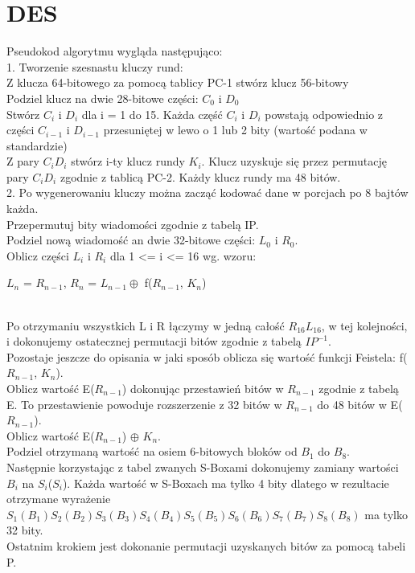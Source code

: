 \documentclass[oneside]{mgr}
\begin{document}
\chapter{DES}
Pseudokod algorytmu wygląda następująco:\vspace*{1 cm}\\
1. Tworzenie szesnastu kluczy rund:\\
Z klucza 64-bitowego za pomocą tablicy PC-1 stwórz klucz 56-bitowy\\
Podziel klucz na dwie 28-bitowe części: $C_0$ i $D_0$\\
Stwórz $C_i$ i $D_i$ dla i = 1 do 15. Każda część $C_i$ i $D_i$ powstają odpowiednio z części $C_{i-1}$ i $D_{i-1}$ przesuniętej w lewo o 1 lub 2 bity (wartość podana w standardzie)\\
Z pary $C_iD_i$ stwórz i-ty klucz rundy $K_i$. Klucz uzyskuje się przez permutację pary $C_iD_i$ zgodnie z tablicą PC-2. Każdy klucz rundy ma 48 bitów.\vspace{1 cm}\\
2. Po wygenerowaniu kluczy można zacząć kodować dane w porcjach po 8 bajtów każda.\\
Przepermutuj bity wiadomości zgodnie z tabelą IP.\\
Podziel nową wiadomość an dwie 32-bitowe części: $L_0$ i $R_0$.\\
Oblicz części $L_i$ i $R_i$ dla 1 <= i <= 16 wg. wzoru:\\\centerline{$L_n$ = $R_{n-1}$, $R_n$ = $L_{n-1} \oplus$ f($R_{n-1}$, $K_n$)}\\	
Po otrzymaniu wszystkich L i R łączymy w jedną całość $R_{16}L_{16}$, w tej kolejności, i dokonujemy ostatecznej permutacji bitów zgodnie z tabelą $IP^{-1}$.\\
Pozostaje jeszcze do opisania w jaki sposób oblicza się wartość funkcji Feistela:  f($R_{n-1}$, $K_n$).\\
Oblicz wartość E($R_{n-1}$) dokonując przestawień bitów w $R_{n-1}$ zgodnie z tabelą E. To przestawienie powoduje rozszerzenie z 32 bitów w  $R_{n-1}$ do 48 bitów w E($R_{n-1}$).\\
Oblicz wartość E($R_{n-1}$) $\oplus$ $K_n$.\\
Podziel otrzymaną wartość na osiem 6-bitowych bloków od $B_1$ do $B_8$.\\
Następnie korzystając z tabel zwanych S-Boxami dokonujemy zamiany wartości $B_i$ na $S_i$($S_i$). Każda wartość w S-Boxach ma tylko 4 bity dlatego w rezultacie otrzymane wyrażenie $S_1(B_1)S_2(B_2)S_3(B_3)S_4(B_4)S_5(B_5)S_6(B_6)S_7(B_7)S_8(B_8)$ ma tylko 32 bity.\\
Ostatnim krokiem jest dokonanie permutacji uzyskanych bitów za pomocą tabeli P.\\
\end{document}
